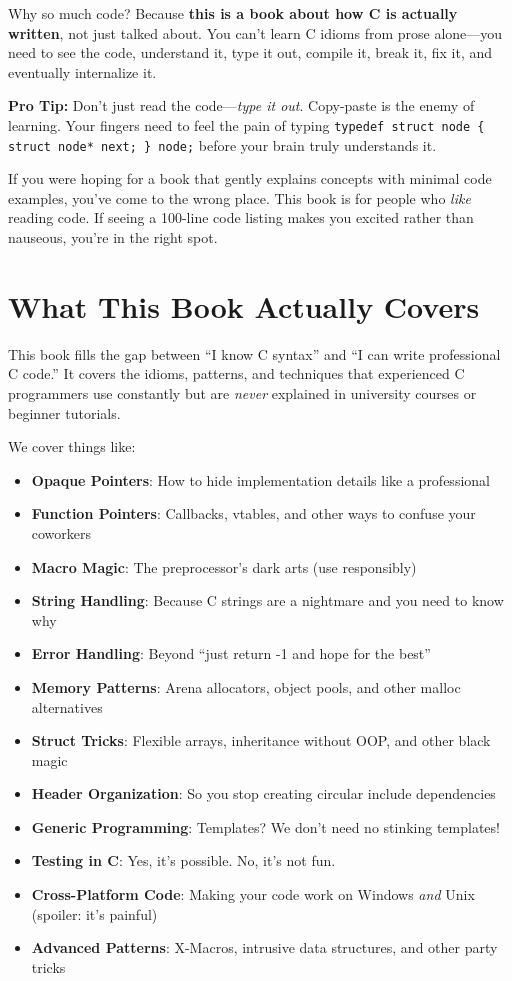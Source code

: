 \documentclass[10pt,openany]{book}
\begin{document}
Why so much code? Because \textbf{this is a book about how C is actually written}, not just talked about. You can't learn C idioms from prose alone---you need to see the code, understand it, type it out, compile it, break it, fix it, and eventually internalize it.

\begin{tipbox}
\textbf{Pro Tip:} Don't just read the code---\textit{type it out}. Copy-paste is the enemy of learning. Your fingers need to feel the pain of typing \texttt{typedef struct node \{ struct node* next; \} node;} before your brain truly understands it.
\end{tipbox}

If you were hoping for a book that gently explains concepts with minimal code examples, you've come to the wrong place. This book is for people who \textit{like} reading code. If seeing a 100-line code listing makes you excited rather than nauseous, you're in the right spot.

\section*{What This Book Actually Covers}

This book fills the gap between ``I know C syntax'' and ``I can write professional C code.'' It covers the idioms, patterns, and techniques that experienced C programmers use constantly but are \textit{never} explained in university courses or beginner tutorials.

We cover things like:
\begin{itemize}
    \item \textbf{Opaque Pointers}: How to hide implementation details like a professional
    \item \textbf{Function Pointers}: Callbacks, vtables, and other ways to confuse your coworkers
    \item \textbf{Macro Magic}: The preprocessor's dark arts (use responsibly)
    \item \textbf{String Handling}: Because C strings are a nightmare and you need to know why
    \item \textbf{Error Handling}: Beyond ``just return -1 and hope for the best''
    \item \textbf{Memory Patterns}: Arena allocators, object pools, and other malloc alternatives
    \item \textbf{Struct Tricks}: Flexible arrays, inheritance without OOP, and other black magic
    \item \textbf{Header Organization}: So you stop creating circular include dependencies
    \item \textbf{Generic Programming}: Templates? We don't need no stinking templates!
    \item \textbf{Testing in C}: Yes, it's possible. No, it's not fun.
    \item \textbf{Cross-Platform Code}: Making your code work on Windows \textit{and} Unix (spoiler: it's painful)
    \item \textbf{Advanced Patterns}: X-Macros, intrusive data structures, and other party tricks
\end{itemize}
\end{document}
